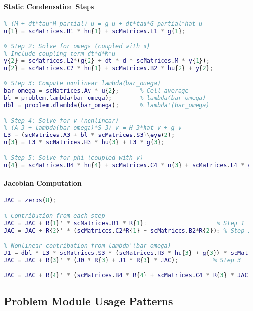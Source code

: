 \paragraph{Static Condensation Steps}
\begin{lstlisting}[language=Matlab, caption=StaticC.m Algorithm Steps]
% Step 1: Solve for u
% (M + dt*tau*M_partial) u = g_u + dt*tau*G_partial*hat_u
u{1} = scMatrices.B1 * hu{1} + scMatrices.L1 * g{1};

% Step 2: Solve for omega (coupled with u)
% Include coupling term dt*d*M*u
y{2} = scMatrices.L2*(g{2} + dt * d * scMatrices.M * y{1});
u{2} = scMatrices.C2 * hu{1} + scMatrices.B2 * hu{2} + y{2};

% Step 3: Compute nonlinear lambda(bar_omega)
bar_omega = scMatrices.Av * u{2};      % Cell average
bl = problem.lambda(bar_omega);        % lambda(bar_omega)
dbl = problem.dlambda(bar_omega);      % lambda'(bar_omega)

% Step 4: Solve for v (nonlinear)
% (A_3 + lambda(bar_omega)*S_3) v = H_3*hat_v + g_v
L3 = (scMatrices.A3 + bl * scMatrices.S3)\eye(2);
u{3} = L3 * scMatrices.H3 * hu{3} + L3 * g{3};

% Step 5: Solve for phi (coupled with v)
u{4} = scMatrices.B4 * hu{4} + scMatrices.C4 * u{3} + scMatrices.L4 * g{4};
\end{lstlisting}

\paragraph{Jacobian Computation}
\begin{lstlisting}[language=Matlab, caption=StaticC.m Jacobian Assembly]
% Build Jacobian dU/d(hat_U) through chain rule
JAC = zeros(8);

% Contribution from each step
JAC = JAC + R{1}' * scMatrices.B1 * R{1};                    % Step 1
JAC = JAC + R{2}' * (scMatrices.C2*R{1} + scMatrices.B2*R{2}); % Step 2

% Nonlinear contribution from lambda'(bar_omega)
J1 = dbl * L3 * scMatrices.S3 * (scMatrices.H3 * hu{3} + g{3}) * scMatrices.Av;
JAC = JAC + R{3}' * (J0 * R{3} + J1 * R{3} * JAC);          % Step 3

JAC = JAC + R{4}' * (scMatrices.B4 * R{4} + scMatrices.C4 * R{3} * JAC); % Step 4
\end{lstlisting}

\subsection{Problem Module Usage Patterns}
\label{subsec:problem_usage_patterns}

